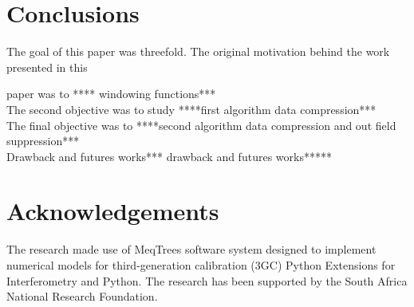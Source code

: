 \documentclass[useAMS,usenatbib]{mn2e}
\begin{document}
\section{Conclusions}
The goal of this paper was threefold. The original motivation behind the work presented in this

paper was to **** windowing functions***\\
The second objective  was to study ****first algorithm data compression***\\
The final objective was to ****second algorithm data compression and out field suppression*** \\
Drawback and futures works*** drawback and futures works*****
\section*{Acknowledgements}
The research  made use of  MeqTrees software system designed to implement numerical models for third-generation calibration (3GC) 
 Python Extensions for Interferometry and Python. The research has been supported by the South Africa National Research Foundation.


\appendix
\end{document}
